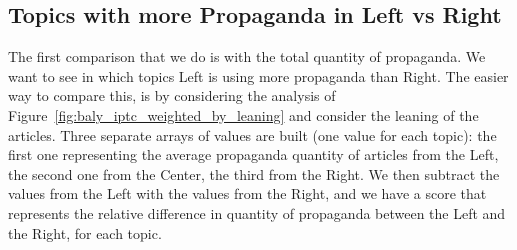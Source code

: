 



\subsection{\statusgreen Topics with more Propaganda in Left vs Right}
\label{ssec:topic_propaganda_leaning_tot_quantity}


The first comparison that we do is with the total quantity of propaganda. We want to see in which topics Left is using more propaganda than Right.
The easier way to compare this, is by considering the analysis of Figure~\ref{fig:baly_iptc_weighted_by_leaning} and consider the leaning of the articles. Three separate arrays of values are built (one value for each topic): the first one representing the average propaganda quantity of articles from the Left, the second one from the Center, the third from the Right.
We then subtract the values from the Left with the values from the Right, and we have a score that represents
the relative difference in quantity of propaganda between the Left and the Right, for each topic.



